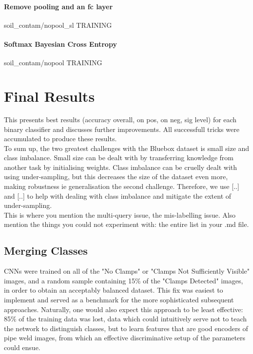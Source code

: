 \documentclass[a4paper,11pt]{article}
\begin{document}
     
\paragraph{Remove pooling and an fc layer}
     soil_contam/nopool_sl                    TRAINING

\paragraph{Softmax Bayesian Cross Entropy}
     soil_contam/nopool                       TRAINING



\section{Final Results}

This presents best results (accuracy overall, on pos, on neg, sig level) for each binary classifier and discusses further improvements. All successfull tricks were accumulated to produce these results. \\

To sum up, the two greatest challenges with the Bluebox dataset is small size and class imbalance. Small size can be dealt with by transferring knowledge from another task by initialising weights. Class imbalance can be cruelly dealt with using under-sampling, but this decreases the size of the dataset even more, making robustness ie generalisation the second challenge. Therefore, we use [..] and [..] to help with dealing with class imbalance and mitigate the extent of under-sampling. \\

This is where you mention the multi-query issue, the mis-labelling issue. Also mention the things you could not experiment with: the entire list in your .md file. \\

\subsection{Merging Classes}

CNNs were trained on all of the "No Clamps" or "Clamps Not Sufficiently Visible" images, and a random sample containing 15\% of the "Clamps Detected" images, in order to obtain an acceptably balanced dataset. This fix was easiest to implement and served as a benchmark for the more sophisticated subsequent approaches. Naturally, one would also expect this approach to be least effective: 85\% of the training data was lost, data which could intuitively serve not to teach the network to distinguish classes, but to learn features that are good encoders of pipe weld images, from which an effective discriminative setup of the parameters could ensue. \\
\end{document}
